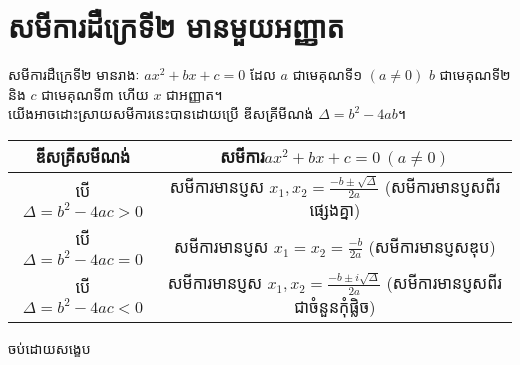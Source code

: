\section{សមីការដឺក្រេទី២ មានមួយអញ្ញាត}
សមីការដឺក្រេទី២ មានរាងៈ $ax^{2}+bx+c=0$ ដែល $a$ ជាមេគុណទី១ $\left(a\ne0\right)$ $b$ ជាមេគុណទី២ និង $c$ ជាមេគុណទី៣ ហើយ $x$ ជាអញ្ញាត។\\
យើងអាចដោះស្រាយសមីការនេះបានដោយប្រើ ឌីសគ្រីមីណង់ $\Delta=b^{2}-4ab$។
\begin{center}
	\begin{tabular}{| c | c |}
		\hline
		 ឌីសគ្រីសមីណង់ & សមីការ​ $ax^{2}+bx+c=0~\left(a\ne 0\right)$ \\ \hline
		 បើ​ $\Delta = b^{2}-4ac>0$ & សមីការមានប្ញស $x_{1}, x_{2}=\frac{-b\pm\sqrt{\Delta}}{2a}$ (សមីការមានប្ញសពីរផ្សេងគ្នា) \\ \hline
		 បើ​ $\Delta = b^{2}-4ac=0$ & សមីការមានប្ញស $x_{1}= x_{2}=\frac{-b}{2a}$ (សមីការមានប្ញសឌុប) \\ \hline
		 បើ $\Delta = b^{2}-4ac<0$ & សមីការមានប្ញស $x_{1}, x_{2}=\frac{-b\pm i\sqrt{\Delta}}{2a}$ (សមីការមានប្ញសពីរជាចំនួនកុំផ្លិច) \\ 
		 \hline
	\end{tabular}
\end{center}
\begin{center}
	{\kml \Large \color{ blue}ចប់ដោយសង្ខេប}
\end{center}